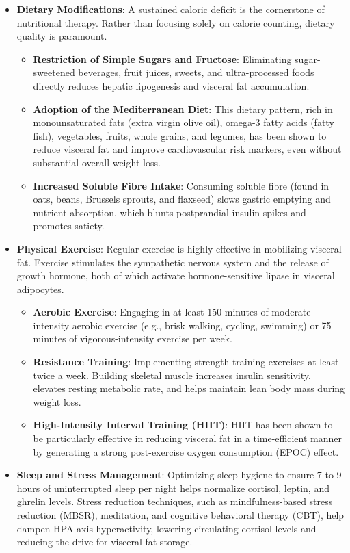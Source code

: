\begin{itemize}
    \item \textbf{Dietary Modifications}: A sustained caloric deficit is the cornerstone of nutritional therapy. Rather than focusing solely on calorie counting, dietary quality is paramount.
    \begin{itemize}
        \item \textbf{Restriction of Simple Sugars and Fructose}: Eliminating sugar-sweetened beverages, fruit juices, sweets, and ultra-processed foods directly reduces hepatic lipogenesis and visceral fat accumulation.
        \item \textbf{Adoption of the Mediterranean Diet}: This dietary pattern, rich in monounsaturated fats (extra virgin olive oil), omega-3 fatty acids (fatty fish), vegetables, fruits, whole grains, and legumes, has been shown to reduce visceral fat and improve cardiovascular risk markers, even without substantial overall weight loss.
        \item \textbf{Increased Soluble Fibre Intake}: Consuming soluble fibre (found in oats, beans, Brussels sprouts, and flaxseed) slows gastric emptying and nutrient absorption, which blunts postprandial insulin spikes and promotes satiety.
    \end{itemize}
    \item \textbf{Physical Exercise}: Regular exercise is highly effective in mobilizing visceral fat. Exercise stimulates the sympathetic nervous system and the release of growth hormone, both of which activate hormone-sensitive lipase in visceral adipocytes.
    \begin{itemize}
        \item \textbf{Aerobic Exercise}: Engaging in at least 150 minutes of moderate-intensity aerobic exercise (e.g., brisk walking, cycling, swimming) or 75 minutes of vigorous-intensity exercise per week.
        \item \textbf{Resistance Training}: Implementing strength training exercises at least twice a week. Building skeletal muscle increases insulin sensitivity, elevates resting metabolic rate, and helps maintain lean body mass during weight loss.
        \item \textbf{High-Intensity Interval Training (HIIT)}: HIIT has been shown to be particularly effective in reducing visceral fat in a time-efficient manner by generating a strong post-exercise oxygen consumption (EPOC) effect.
    \end{itemize}
    \item \textbf{Sleep and Stress Management}: Optimizing sleep hygiene to ensure 7 to 9 hours of uninterrupted sleep per night helps normalize cortisol, leptin, and ghrelin levels. Stress reduction techniques, such as mindfulness-based stress reduction (MBSR), meditation, and cognitive behavioral therapy (CBT), help dampen HPA-axis hyperactivity, lowering circulating cortisol levels and reducing the drive for visceral fat storage.

\end{itemize}
